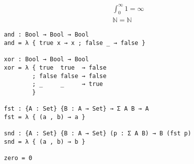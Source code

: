 \documentclass[a4paper]{article}
\begin{document}
\begin{align*}
	∫_0^∞ 1 = ∞ \\
	\mathbb{N} = ℕ
\end{align*}

\begin{lstlisting}
and : Bool → Bool → Bool
and = λ { true x → x ; false _ → false }

xor : Bool → Bool → Bool
xor = λ { true  true  → false
        ; false false → false
        ; _     _     → true
        }

fst : {A : Set} {B : A → Set} → Σ A B → A
fst = λ { (a , b) → a }

snd : {A : Set} {B : A → Set} (p : Σ A B) → B (fst p)
snd = λ { (a , b) → b }

zero = 0
\end{lstlisting}
\end{document}
